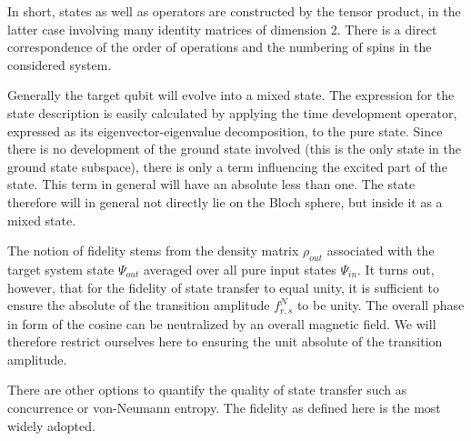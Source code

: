 \begin{center}
\end{center}

\noindent In short, states as well as operators are constructed by the tensor product, in the latter case involving many identity matrices of dimension 2. There is a direct correspondence of the order of operations and the numbering of spins in the considered system.


\begin{center}
\end{center}

\noindent Generally the target qubit will evolve into a mixed state\cite{Bose2014}. The expression for the state description is easily calculated by applying the time development operator, expressed as its eigenvector-eigenvalue decomposition, to the pure state. Since there is no development of the ground state involved (this is the only state in the ground state subspace), there is only a term influencing the excited part of the state. This term in general will have an absolute less than one. The state therefore will in general not directly lie on the Bloch sphere, but inside it as a mixed state.\par
The notion of fidelity stems from the density matrix $\rho_{out}$ associated with the target system state $\Psi_{out}$ averaged over all pure input states $\Psi_{in}$\cite{Bose2003}. It turns out, however, that for the fidelity of state transfer to equal unity, it is sufficient to ensure the absolute of the transition amplitude $f^N_{r,s}$ to be unity. The overall phase in form of the cosine can be neutralized by an overall magnetic field. We will therefore restrict ourselves here to ensuring the unit absolute of the transition amplitude.\par
There are other options to quantify the quality of state transfer such as concurrence or von-Neumann entropy. The fidelity as defined here is the most widely adopted.


